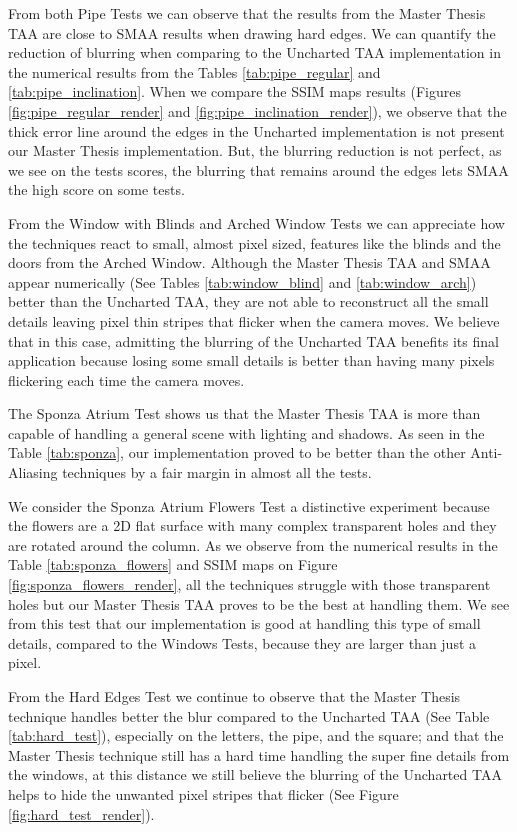 \documentclass[pregrado]{tesis-usb} %
\begin{document}
From both Pipe Tests we can observe that the results from the Master Thesis TAA are close to SMAA results when drawing hard edges. We can quantify the reduction of blurring when comparing to the Uncharted TAA implementation in the numerical results from the Tables \ref{tab:pipe_regular} and \ref{tab:pipe_inclination}. When we compare the SSIM maps results (Figures \ref{fig:pipe_regular_render} and \ref{fig:pipe_inclination_render}), we observe that the thick error line around the edges in the Uncharted implementation is not present our Master Thesis implementation. But, the blurring reduction is not perfect, as we see on the tests scores, the blurring that remains around the edges lets SMAA the high score on some tests.

From the Window with Blinds and Arched Window Tests we can appreciate how the techniques react to small, almost pixel sized, features like the blinds and the doors from the Arched Window. Although the Master Thesis TAA and SMAA appear numerically (See Tables \ref{tab:window_blind} and \ref{tab:window_arch}) better than the Uncharted TAA, they are not able to reconstruct all the small details leaving pixel thin stripes that flicker when the camera moves. We believe that in this case, admitting the blurring of the Uncharted TAA benefits its final application because losing some small details is better than having many pixels flickering each time the camera moves.

The Sponza Atrium Test shows us that the Master Thesis TAA is more than capable of handling a general scene with lighting and shadows. As seen in the Table \ref{tab:sponza}, our implementation proved to be better than the other Anti-Aliasing techniques by a fair margin in almost all the tests.

We consider the Sponza Atrium Flowers Test a distinctive experiment because the flowers are a 2D flat surface with many complex transparent holes and they are rotated around the column. As we observe from the numerical results in the Table \ref{tab:sponza_flowers} and SSIM maps on Figure \ref{fig:sponza_flowers_render}, all the techniques struggle with those transparent holes but our Master Thesis TAA proves to be the best at handling them.  We see from this test that our implementation is good at handling this type of small details, compared to the Windows Tests, because they are larger than just a pixel. 

From the Hard Edges Test we continue to observe that the Master Thesis technique handles better the blur compared to the Uncharted TAA (See Table \ref{tab:hard_test}), especially on the letters, the pipe, and the square; and that the Master Thesis technique still has a hard time handling the super fine details from the windows, at this distance we still believe the blurring of the Uncharted TAA helps to hide the unwanted pixel stripes that flicker (See Figure \ref{fig:hard_test_render}).
\end{document}
